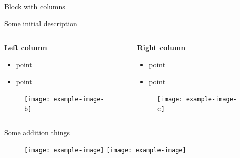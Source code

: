 \documentclass[aspectratio=1610]{beamer}
\begin{document}
\begin{frame}{}
\begin{columns}[t]
\begin{column}{.5\linewidth}
            \begin{haiblock}{Block with columns}

            Some initial description

            \begin{columns}[t]
                \begin{column}{0.5\linewidth}
                
                \textbf{Left column}
                \begin{itemize}
                    \item point
                    \item point
                \end{itemize}
                \begin{figure}
                    \centering
                    \texttt{[image: example-image-b]}%
                \end{figure}
                    
                \end{column}
                \begin{column}{0.5\linewidth}
                
                \textbf{Right column}
                \begin{itemize}
                    \item point
                    \item point
                \end{itemize}
                \begin{figure}
                    \centering
                    \texttt{[image: example-image-c]}%
                \end{figure}
                    
                \end{column}
            \end{columns}

            \vspace{1em}

            Some addition things
            \begin{figure}
                \centering
                \texttt{[image: example-image]}%
                \hfill%
                \texttt{[image: example-image]}%
            \end{figure}
                
            \end{haiblock}
            

\end{column}
\end{columns}
\end{frame}
\end{document}
